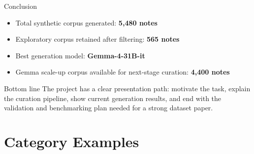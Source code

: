 \documentclass[aspectratio=169]{beamer}
\begin{document}
\begin{frame}{Conclusion}
    \begin{itemize}
        \item Total synthetic corpus generated: \textbf{5,480 notes}
        \item Exploratory corpus retained after filtering: \textbf{565 notes}
        \item Best generation model: \textbf{Gemma-4-31B-it}
        \item Gemma scale-up corpus available for next-stage curation: \textbf{4,400 notes}
    \end{itemize}

    \vspace{0.75em}
    \begin{block}{Bottom line}
        The project has a clear presentation path: motivate the task, explain the curation pipeline, show current generation results, and end with the validation and benchmarking plan needed for a strong dataset paper.
    \end{block}
\end{frame}

\appendix
\section{Category Examples}
\end{document}
